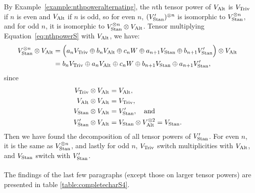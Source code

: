 {\begin{example}
	By Example~\ref{example:nthpoweralternating}, the $n$th tensor power of $V_{\text{Alt}}$ is $V_{\text{Triv}}$ if $n$ is even and $V_{\text{Alt}}$ if $n$ is odd, so for even $n$, $(V'_{\text{Stan}})^{\otimes n}$ is isomorphic to $V_{\text{Stan}}^{\otimes n}$, and for odd $n$, it is isomorphic to $ V_{\text{Stan}}^{\otimes n} \otimes V_{\text{Alt}}$. Tensor multiplying Equation~\ref{eq:nthpowerS} with $V_{\text{Alt}}$, we have:
	\begin{align*}
		V_{\text{Stan}}^{\otimes n} \otimes V_{\text{Alt}} &= \Big(a_n V_{\text{Triv}} \oplus b_n V_{\text{Alt}} \oplus c_n W \oplus a_{n+1} V_{\text{Stan}} \oplus b_{n+1} V'_{\text{Stan}}\Big)\otimes V_{\text{Alt}} \\
		&= b_n V_{\text{Triv}} \oplus a_n V_{\text{Alt}} \oplus c_n W \oplus b_{n+1} V_{\text{Stan}} \oplus a_{n+1} V'_{\text{Stan}},
	\end{align*}
	since 
	\begin{align*}
		V_{\text{Triv}} \otimes V_{\text{Alt}} &= V_{\text{Alt}}, \\
		V_{\text{Alt}} \otimes V_{\text{Alt}} &= V_{\text{Triv}}, \\
		V_{\text{Stan}} \otimes V_{\text{Alt}} &= V'_{\text{Stan}}, \quad \text{and} \\
		V'_{\text{Stan}} \otimes V_{\text{Alt}} &= V_{\text{Stan}} \otimes V_{\text{Alt}}^{\otimes 2} = V_{\text{Stan}}.
	\end{align*}
	Then we have found the decomposition of all tensor powers of $V'_{\text{Stan}}$. For even $n$, it is the same as $V_{\text{Stan}}^{\otimes n}$, and lastly for odd $n$, $V_{\text{Triv}}$ switch multiplicities with $V_{\text{Alt}}$, and $V_{\text{Stan}}$ switch with $V'_{\text{Stan}}$.
	
	\paragraph{} The findings of the last few paragraphs (except those on larger tensor powers) are presented in table \ref{table:completecharS4}.
	

\end{example}}
